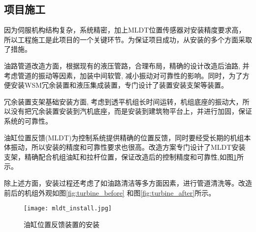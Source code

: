 \documentclass[UTF8,a1paper,twoside,11pt]{article}
\begin{document}
{\begin{multicols}{2}
\section*{项目施工}
因为伺服机构结构复杂，系统精密，加上MLDT位置传感器对安装精度要求高，所以工程施工是此项目的一个关键环节。为保证项目成功，从安装的多个方面采取了措施。\par
油路管道改造方面，根据现有的液压管路，合理布局，精确的设计改造后油路, 并考虑管道的振动等因素，加装中间软管, 减小振动对可靠性的影响。同时，为了方便安装WSM冗余装置和液压集成装置，专门设计了装置安装支架等装置。\par

冗余装置支架基础安装方面, 考虑到透平机组长时间运转，机组底座的振动大，所以没有把冗余装置安装到汽机底座，而是安装到建筑物平台上，并进行加固，保证系统的可靠性。

油缸位置反馈(MLDT)为控制系统提供精确的位置反馈，同时要经受长期的机组本体振动，所以安装的精度和可靠性要求也很高。改造方案专门设计了MLDT安装支架，精确配合机组油缸和拉杆位置，保证改造后的控制精度和可靠性,如图\ref{fig:mldt_install}所示。\par
除上述方面，安装过程还考虑了如油路清洁等多方面因素，进行管道清洗等。改造前后的机组外观如图\ref{fig:turbine_before} 和图\ref{fig:turbine_after}所示。\par
\begin{figure}[H]
\begin{center}
\texttt{[image: mldt\_install.jpg]}
\caption{油缸位置反馈装置的安装}
\label{fig:mldt_install}
\end{center}
\end{figure}

\end{multicols}}
\end{document}
